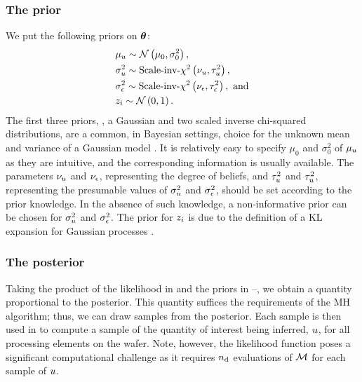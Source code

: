 \subsubsection{The prior}
We put the following priors on ${\boldsymbol\theta}$:
\begin{align}
  & \mu_\u \sim \gaussian{\mu_0}{\sigma^2_0}, \elabel{mu-u-prior} \\
  & \sigma^2_\u \sim \sichisquared{\nu_\u}{\tau^2_\u}, \elabel{sigma2-u-prior} \\
  & \sigma^2_\noise \sim \sichisquared{\nu_\noise}{\tau^2_\noise}, \text{ and} \elabel{sigma2-noise-prior} \\
  & \z_i \sim \gaussian{0}{1}. \elabel{z-prior}
\end{align}
The first three priors, \ie, a Gaussian and two scaled inverse chi-squared distributions, are a common, in Bayesian settings, choice for the unknown mean and variance of a Gaussian model \cite{gelman2004}. It is relatively easy to specify $\mu_0$ and $\sigma^2_0$ of $\mu_u$ as they are intuitive, and the corresponding information is usually available. The parameters $\nu_u$ and $\nu_\epsilon$, representing the degree of beliefs, and $\tau^2_u$ and $\tau^2_u$, representing the presumable values of $\sigma^2_u$ and $\sigma^2_\epsilon$, should be set according to the prior knowledge. In the absence of such knowledge, a non-informative prior can be chosen for $\sigma^2_u$ and $\sigma^2_\epsilon$. The prior for $z_i$ is due to the definition of a KL expansion for Gaussian processes \cite{marzouk2009}.

\subsubsection{The posterior}
Taking the product of the likelihood in  and the priors in --, we obtain a quantity proportional to the posterior. This quantity suffices the requirements of the MH algorithm; thus, we can draw samples from the posterior. Each sample is then used in  to compute a sample of the quantity of interest being inferred, $u$, for all processing elements on the wafer. Note, however, the likelihood function poses a significant computational challenge as it requires ${n_{\text{d}}}$ evaluations of $\model$ for each sample of $u$.
